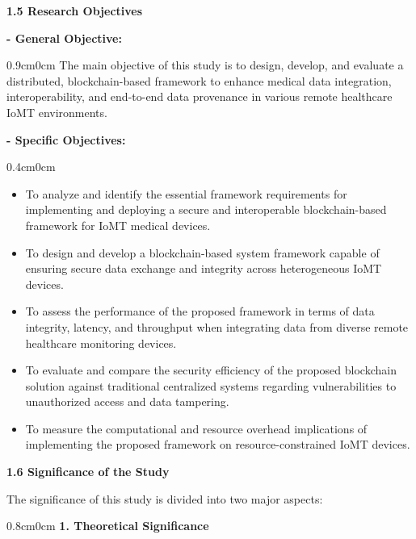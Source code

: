 \documentclass[12pt, a4paper]{report}
\begin{document}
\vspace{0.5cm}
{\color{myblue} \Large \bfseries 1.5 Research Objectives}

{\color{myblue} \bfseries - General Objective:} \\ \begin{adjustwidth}{0.9cm}{0cm}
\vspace{-2.0em}
The main objective of this study is to design, develop, and evaluate a distributed, blockchain-based framework to enhance medical data integration, interoperability, and end-to-end data provenance in various remote healthcare IoMT environments.
\end{adjustwidth}

{\color{myblue} \bfseries -	Specific Objectives:}
\vspace{-1.0em}
\begin{adjustwidth}{0.4cm}{0cm}
    \begin{itemize}[nosep, topsep=0pt, partopsep=0pt]
    \item To analyze and identify the essential framework requirements for implementing and deploying a secure and interoperable blockchain-based framework for IoMT medical devices.
    \item To design and develop a blockchain-based system framework capable of ensuring secure data exchange and integrity across heterogeneous IoMT devices.
    \item To assess the performance of the proposed framework in terms of data integrity, latency, and throughput when integrating data from diverse remote healthcare monitoring devices.
    \item To evaluate and compare the security efficiency of the proposed blockchain solution against traditional centralized systems regarding vulnerabilities to unauthorized access and data tampering.
    \item To measure the computational and resource overhead implications of implementing the proposed framework on resource-constrained IoMT devices.
\end{itemize}
\end{adjustwidth}


\vspace{0.5cm}
{\color{myblue} \Large \bfseries 1.6 Significance of the Study}

The significance of this study is divided into two major aspects:

\begin{adjustwidth}{0.8cm}{0cm}
 {\color{myblue} \bfseries 1. Theoretical Significance}   
\end{adjustwidth}
\end{document}
